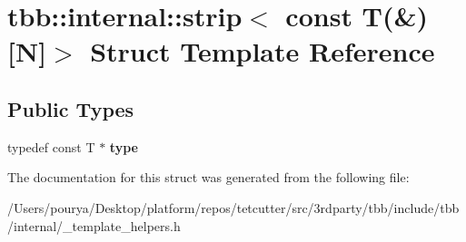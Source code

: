 \hypertarget{structtbb_1_1internal_1_1strip_3_01const_01T_07_6_08[N]_4}{}\section{tbb\+:\+:internal\+:\+:strip$<$ const T(\&)\mbox{[}N\mbox{]}$>$ Struct Template Reference}
\label{structtbb_1_1internal_1_1strip_3_01const_01T_07_6_08[N]_4}
\subsection*{Public Types}
\begin{DoxyCompactItemize}
\item 
\hypertarget{structtbb_1_1internal_1_1strip_3_01const_01T_07_6_08[N]_4_af96ea6d4be91e2a0d93662334d97f419}{}typedef const T $\ast$ {\bfseries type}\label{structtbb_1_1internal_1_1strip_3_01const_01T_07_6_08[N]_4_af96ea6d4be91e2a0d93662334d97f419}

\end{DoxyCompactItemize}


The documentation for this struct was generated from the following file\+:\begin{DoxyCompactItemize}
\item 
/\+Users/pourya/\+Desktop/platform/repos/tetcutter/src/3rdparty/tbb/include/tbb/internal/\+\_\+template\+\_\+helpers.\+h\end{DoxyCompactItemize}
